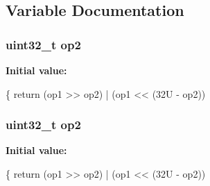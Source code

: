 \subsection{Variable Documentation}
\hypertarget{group___c_m_s_i_s___core___instruction_interface_gadb2bb33809b6f35ba4d176cbec7c7b75}{
\subsubsection[{op2}]{\setlength{\rightskip}{0pt plus 5cm}uint32\-\_\-t op2}}\label{group___c_m_s_i_s___core___instruction_interface_gadb2bb33809b6f35ba4d176cbec7c7b75}
{\bfseries Initial value\-:}
\begin{DoxyCode}
\{
  \textcolor{keywordflow}{return} (op1 >> op2) | (op1 << (32U - op2))
\end{DoxyCode}
\hypertarget{group___c_m_s_i_s___core___instruction_interface_gadb2bb33809b6f35ba4d176cbec7c7b75}{
\subsubsection[{op2}]{\setlength{\rightskip}{0pt plus 5cm}uint32\-\_\-t op2}}\label{group___c_m_s_i_s___core___instruction_interface_gadb2bb33809b6f35ba4d176cbec7c7b75}
{\bfseries Initial value\-:}
\begin{DoxyCode}
\{
  \textcolor{keywordflow}{return} (op1 >> op2) | (op1 << (32U - op2))
\end{DoxyCode}
